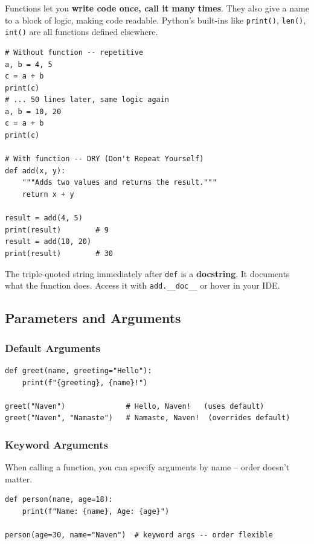 \documentclass[12pt,a4paper]{article}
\newcommand{\code}[1]{\texttt{\small\color{pyblue}#1}}
\begin{document}
Functions let you \textbf{write code once, call it many times}. They also give a name to a block of logic, making code readable. Python's built-ins like \code{print()}, \code{len()}, \code{int()} are all functions defined elsewhere.

\begin{lstlisting}
# Without function -- repetitive
a, b = 4, 5
c = a + b
print(c)
# ... 50 lines later, same logic again
a, b = 10, 20
c = a + b
print(c)

# With function -- DRY (Don't Repeat Yourself)
def add(x, y):
    """Adds two values and returns the result."""
    return x + y

result = add(4, 5)
print(result)        # 9
result = add(10, 20)
print(result)        # 30
\end{lstlisting}

\begin{notebox}
The triple-quoted string immediately after \code{def} is a \textbf{docstring}. It documents what the function does. Access it with \code{add.\_\_doc\_\_} or hover in your IDE.
\end{notebox}

\subsection{Parameters and Arguments}

\subsubsection{Default Arguments}

\begin{lstlisting}
def greet(name, greeting="Hello"):
    print(f"{greeting}, {name}!")

greet("Naven")              # Hello, Naven!   (uses default)
greet("Naven", "Namaste")   # Namaste, Naven!  (overrides default)
\end{lstlisting}

\subsubsection{Keyword Arguments}

When calling a function, you can specify arguments by name -- order doesn't matter.

\begin{lstlisting}
def person(name, age=18):
    print(f"Name: {name}, Age: {age}")

person(age=30, name="Naven")  # keyword args -- order flexible
\end{lstlisting}
\end{document}
